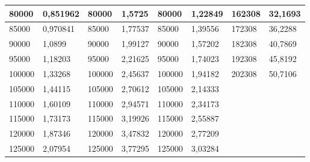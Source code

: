\documentclass[11pt]{article}
\begin{document}
\begin{table}[!ht]
\begin{tabular}{|l|l|l|l|l|l|l|l|}
        80000 & 0,851962 & 80000 & 1,5725 & 80000 & 1,22849 & 162308 & 32,1693 \\ \hline
        85000 & 0,970841 & 85000 & 1,77537 & 85000 & 1,39556 & 172308 & 36,2288 \\ \hline
        90000 & 1,0899 & 90000 & 1,99127 & 90000 & 1,57202 & 182308 & 40,7869 \\ \hline
        95000 & 1,18203 & 95000 & 2,21625 & 95000 & 1,74023 & 192308 & 45,8192 \\ \hline
        100000 & 1,33268 & 100000 & 2,45637 & 100000 & 1,94182 & 202308 & 50,7106 \\ \hline
        105000 & 1,44115 & 105000 & 2,70612 & 105000 & 2,14333 & ~ & ~ \\ \hline
        110000 & 1,60109 & 110000 & 2,94571 & 110000 & 2,34173 & ~ & ~ \\ \hline
        115000 & 1,73173 & 115000 & 3,19926 & 115000 & 2,55887 & ~ & ~ \\ \hline
        120000 & 1,87346 & 120000 & 3,47832 & 120000 & 2,77209 & ~ & ~ \\ \hline
        125000 & 2,07954 & 125000 & 3,77295 & 125000 & 3,03284 & ~ & \\\hline
    \end{tabular}
\end{table}
\end{document}
